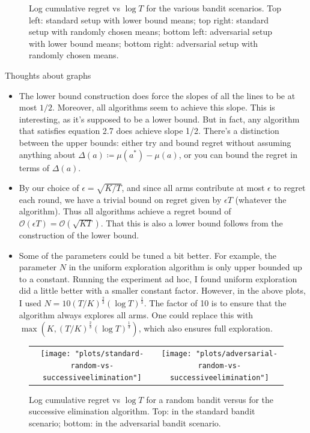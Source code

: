\documentclass[10pt]{article}
\newcommand{\bigoh}{\mathcal{O}}
\begin{document}
\begin{figure}[!ht]
\begin{tabular}{cc}
    \end{tabular}
    \caption{Log cumulative regret vs $\log T$ for the various bandit scenarios.
    Top left: standard setup with lower bound means; top right: standard setup
    with randomly chosen means; bottom left: adversarial setup with lower bound
    means; bottom right: adversarial setup with randomly chosen means.}
    \label{figure-graphs}
\end{figure}

Thoughts about graphs
\begin{itemize}
    \item The lower bound construction does force the slopes of all the
    lines to be at most $1/2$. Moreover, all algorithms seem to achieve this
    slope. This is interesting, as it's supposed to be a lower bound. But in
    fact, any algorithm that satisfies \cite{Slivkins} equation 2.7 does achieve
    slope 1/2. There's a distinction between the upper bounds: either try and
    bound regret without assuming anything about $\Delta(a) \coloneqq \mu(a^*) -
    \mu(a)$, or you can bound the regret in terms of $\Delta(a)$.
    \item By our choice of $\epsilon = \sqrt{K/T}$, and since all arms
    contribute at most $\epsilon$ to regret each round, we have a trivial bound
    on regret given by $\epsilon T$ (whatever the algorithm). Thus all
    algorithms achieve a regret bound of $\bigoh(\epsilon T) = \bigoh(\sqrt{K
    T})$. That this is also a lower bound follows from the construction of the
    lower bound.

    \item Some of the parameters could be tuned a bit better. For example,
    the parameter $N$ in the uniform exploration algorithm is only upper bounded
    up to a constant. Running the experiment ad hoc, I found uniform exploration
    did a little better with a smaller constant factor. However, in the above
    plots, I used $N = 10 (T / K)^{\frac{2}{3}} (\log T)^{\frac{1}{3}}$. The
    factor of 10 is to ensure that the algorithm always explores all arms. One
    could replace this with $\max(K, (T / K)^{\frac{2}{3}} (\log
    T)^{\frac{1}{3}})$, which also ensures full exploration.
\end{itemize}

\begin{figure}[!ht]
    \center
    \begin{tabular}{cc}
        \texttt{[image: "plots/standard-random-vs-successiveelimination"]} &
        \texttt{[image: "plots/adversarial-random-vs-successiveelimination"]}
    \end{tabular}
    \caption{Log cumulative regret vs $\log T$ for a random bandit versus for
    the successive elimination algorithm. Top: in the standard bandit scenario;
    bottom: in the adversarial bandit scenario.}
    \label{figure-graphs}
\end{figure}




\end{document}
